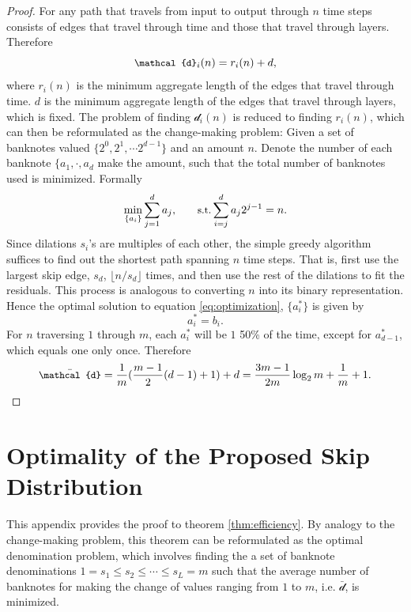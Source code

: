 \documentclass{article}
\begin{document}
\begin{proof}
For any path that travels from input to output through $n$ time steps consists of edges that travel through time and those that travel through layers. Therefore
\begin{equation}
\small
\mathcal{d}_i(n) = r_i(n) + d,
\label{eq:mean_length_decomp}
\end{equation}
where $r_i(n)$ is the minimum aggregate length of the edges that travel through time. $d$ is the minimum aggregate length of the edges that travel through layers, which is fixed. The problem of finding $\mathcal{d}_i(n)$ is reduced to finding $r_i(n)$, which can then be reformulated as the change-making problem: Given a set of banknotes valued $\{ 2^0, 2^1, \cdots 2^{d-1} \}$ and an amount $n$. Denote the number of each banknote $\{ a_1, \cdot, a_d$ make the amount, such that the total number of banknotes used is minimized. Formally
\begin{equation}
\small
\min_{\{a_i\}} \sum_{j=1}^d a_j, \qquad \mbox{s.t.} \sum_{i=j}^d a_j 2^{j-1} = n
\label{eq:optimization}
.\end{equation}
Since dilations $s_i$'s are multiples of each other, the simple greedy algorithm suffices to find out the shortest path spanning $n$ time steps. That is, first use the largest skip edge, $s_d$, $\lfloor n / s_d \rfloor$ times, and then use the rest of the dilations to fit the residuals. This process is analogous to converting $n$ into its binary representation. Hence the optimal solution to equation \eqref{eq:optimization}, $\{a_i^*\}$ is given by
\begin{equation}
a_i^* = b_i.
\end{equation}
For $n$ traversing $1$ through $m$, each $a_i^*$ will be $1$ 50\% of the time, except for $a_{d-1}^*$, which equals one only once. Therefore
\begin{equation}
\small
\bar{\mathcal{d}} = \frac{1}{m} (\frac{m-1}{2}(d-1) + 1 ) + d = \frac{3m-1}{2m} \log_2 m + \frac{1}{m} + 1.
\end{equation}

\end{proof}

\section{Optimality of the Proposed Skip Distribution}
\label{appendix:optimality}
This appendix provides the proof to theorem \ref{thm:efficiency}. By analogy to the change-making problem, this theorem can be reformulated as the optimal denomination problem, which involves finding the a set of banknote denominations $1=s_1 \leq s_2 \leq \cdots \leq s_L=m$ such that the average number of banknotes for making the change of values ranging from $1$ to $m$, i.e. $\bar{\mathcal{d}}$, is minimized.
\end{document}
